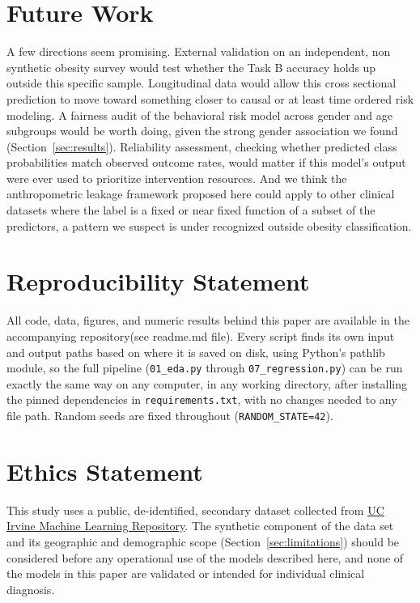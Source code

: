 \documentclass[journal]{IEEEtran}
\begin{document}
\section{Future Work}
\label{sec:future}
A few directions seem promising. External validation on an independent, non synthetic obesity survey would test whether the Task B accuracy holds up outside this specific sample. Longitudinal data would allow this cross sectional prediction to move toward something closer to causal or at least time ordered risk modeling. A fairness audit of the behavioral risk model across gender and age subgroups would be worth doing, given the strong gender association we found (Section~\ref{sec:results}). Reliability assessment, checking whether predicted class probabilities match observed outcome rates, would matter if this model's output were ever used to prioritize intervention resources. And we think the anthropometric leakage framework proposed here could apply to other clinical datasets where the label is a fixed or near fixed function of a subset of the predictors, a pattern we suspect is under recognized outside obesity classification.

\section*{Reproducibility Statement}
\label{sec:repro}
All code, data, figures, and numeric results behind this paper are available in the accompanying repository(see readme.md file). Every script finds its own input and output paths based on where it is saved on disk, using Python's pathlib module, so the full pipeline (\texttt{01\_eda.py} through \texttt{07\_regression.py}) can be run exactly the same way on any computer, in any working directory, after installing the pinned dependencies in \texttt{requirements.txt}, with no changes needed to any file path. Random seeds are fixed throughout (\texttt{RANDOM\_STATE=42}).

\section*{Ethics Statement}
This study uses a public, de-identified, secondary dataset \cite{palechor2019dataset} collected from \href{https://archive.ics.uci.edu/dataset/544/estimation+of+obesity+levels+based+on+eating+habits+and+physical+condition}{UC Irvine Machine Learning Repository}. The synthetic component of the data set and its geographic and demographic scope (Section~\ref{sec:limitations}) should be considered before any operational use of the models described here, and none of the models in this paper are validated or intended for individual clinical diagnosis.
\end{document}
